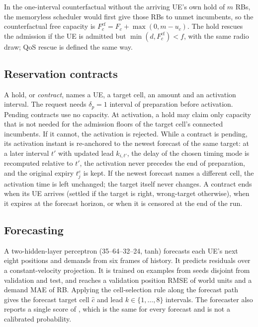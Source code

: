 \documentclass[conference]{IEEEtran}
\begin{document}
In the one-interval counterfactual without the arriving UE's own hold of $m$ RBs, the memoryless scheduler would first give those RBs to unmet incumbents, so the counterfactual free capacity is $F_c^{\mathrm{cf}}=F_c+\max(0,m-u_c)$. The hold rescues the admission if the UE is admitted but $\min(d,F_c^{\mathrm{cf}})<f$, with the same radio draw; QoS rescue is defined the same way.

\subsection{Reservation contracts}
A hold, or \emph{contract}, names a UE, a target cell, an amount and an activation interval. The request needs $\delta_p=1$ interval of preparation before activation. Pending contracts use no capacity. At activation, a hold may claim only capacity that is not needed for the admission floors of the target cell's connected incumbents. If it cannot, the activation is rejected. While a contract is pending, its activation instant is re-anchored to the newest forecast of the same target: at a later interval $t'$ with updated lead $k_{i,t'}$, the delay of the chosen timing mode is recomputed relative to $t'$, the activation never precedes the end of preparation, and the original expiry $t^e_j$ is kept. If the newest forecast names a different cell, the activation time is left unchanged; the target itself never changes. A contract ends when its UE arrives (settled if the target is right, wrong-target otherwise), when it expires at the forecast horizon, or when it is censored at the end of the run.

\subsection{Forecasting}
A two-hidden-layer perceptron (35--64--32--24, tanh) forecasts each UE's next eight positions and demands from six frames of history. It predicts residuals over a constant-velocity projection. It is trained on \ForecastTrainExamples{} examples from seeds disjoint from validation and test, and reaches a validation position RMSE of \ForecastPosRMSE{} world units and a demand MAE of \ForecastDemandMAE{} RB. Applying the cell-selection rule along the forecast path gives the forecast target cell $\hat c$ and lead $k\in\{1,\dots,8\}$ intervals. The forecaster also reports a single score of \ForecastScore{}, which is the same for every forecast and is not a calibrated probability.

\end{document}
